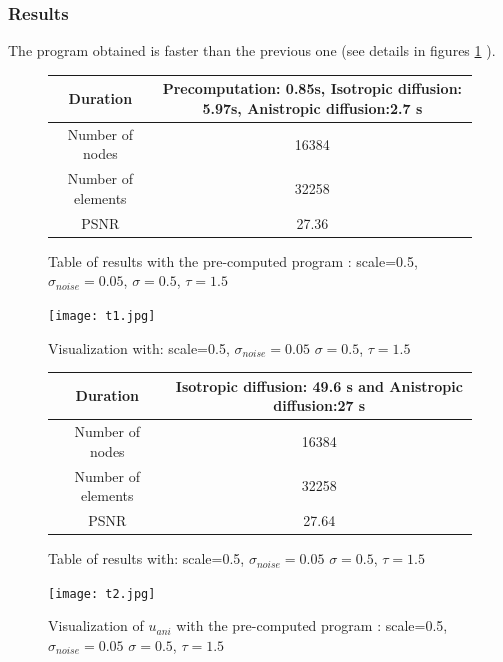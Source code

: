 \documentclass{report}
\begin{document}
\subsubsection{Results}

The program obtained is faster than the previous one (see details in figures \ref{T2} ). 

         \begin{figure}[h!]
         	\centering
         	\label{T2}
         	\begin{tabular}{|c|c|}
         		\hline
         		Duration &  Precomputation: 0.85s,
         		Isotropic diffusion: 5.97s,
         		Anistropic diffusion:2.7 s   \\
         		\hline
         		Number of nodes & 16384 \\
         		\hline
         		Number of elements & 32258\\
         		
         		\hline
         		PSNR & 27.36 \\
         		\hline
         	\end{tabular}
         	\caption{Table of results with the pre-computed program : scale=0.5, $\sigma_{noise}=0.05$, $\sigma=0.5$, $\tau=1.5$ }
         \end{figure}


\begin{figure}[h!]
	\centering
	\label{t1}
	\caption{Visualization with: scale=0.5, $\sigma_{noise}=0.05$  $\sigma=0.5$, $\tau=1.5$ }
	\texttt{[image: t1.jpg]}
\end{figure}

\begin{figure}[h!]
	\caption{Table of results with: scale=0.5, $\sigma_{noise}=0.05$  $\sigma=0.5$, $\tau=1.5$ }
	\centering
	\label{T1}
	\begin{tabular}{|c|c|}
		\hline
		Duration &  Isotropic diffusion: 49.6 s
		and Anistropic diffusion:27 s   \\
		\hline
		Number of nodes & 16384 \\
		\hline
		Number of elements & 32258\\
		\hline
		PSNR & 27.64\\
		\hline
	\end{tabular}
\end{figure}

        \begin{figure}
        \label{t2}
        \caption{Visualization of $u_{ani}$ with the pre-computed program : scale=0.5, $\sigma_{noise}=0.05$  $\sigma=0.5$, $\tau=1.5$ }
        \centering
        \texttt{[image: t2.jpg]}
        \end{figure}
\end{document}
